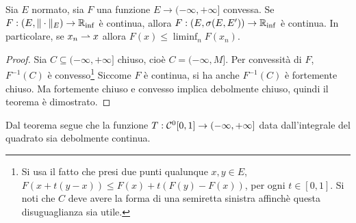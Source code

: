 \begin{theorem}
\label{th:weaktop_seven}
	Sia $E$ normato, sia $F$ una funzione $E \to (-\infty, +\infty]$ convessa.
	Se $F : (E, \|\cdot\|_E) \to \mathbb{R}_{\inf}$ è continua, allora $F : (E, \sigma(E,E')) \to \mathbb{R}_{\inf}$ è continua.
	In particolare, se $x_n \rightharpoonup x$ allora $F(x) \leq \liminf_n F(x_n)$.
\end{theorem}
\begin{proof}
	Sia $C \subseteq (-\infty, + \infty]$ chiuso, cioè $C=(-\infty, M]$. Per convessità di $F$, $F^{-1}(C)$ è convesso\footnote{Si usa il fatto che presi due punti qualunque $x,y \in E$, $F(x+t(y-x)) \leq F(x) + t(F(y) - F(x))$, per ogni $t \in [0,1]$. Si noti che $C$ deve avere la forma di una semiretta sinistra affinchè questa disuguaglianza sia utile.}
	Siccome $F$ è continua, si ha anche $F^{-1}(C)$ è fortemente chiuso. Ma fortemente chiuso e convesso implica debolmente chiuso, quindi il teorema è dimostrato.
\end{proof}

\begin{remark}
	Dal teorema segue che la funzione $T: \mathcal{C}^0[0,1] \to (-\infty,+\infty]$ data dall'integrale del quadrato sia debolmente continua.
\end{remark}

